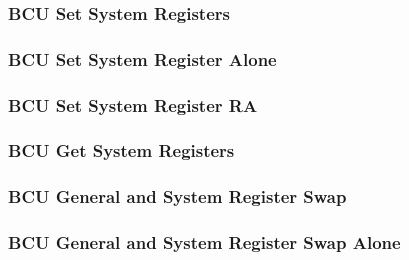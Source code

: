 \subsubsection[{\small BCU Set System Registers}]{BCU Set System Registers} \label{sec:format-BCU-SET}



\subsubsection[{\small BCU Set System Register Alone}]{BCU Set System Register Alone} \label{sec:format-BCU-SETA}



\subsubsection[{\small BCU Set System Register RA}]{BCU Set System Register RA} \label{sec:format-BCU-SETRA}



\subsubsection[{\small BCU Get System Registers}]{BCU Get System Registers} \label{sec:format-BCU-GSR}



\subsubsection[{\small BCU General and System Register Swap}]{BCU General and System Register Swap} \label{sec:format-BCU-RSWAP}



\subsubsection[{\small BCU General and System Register Swap Alone}]{BCU General and System Register Swap Alone} \label{sec:format-BCU-RSWAPA}



